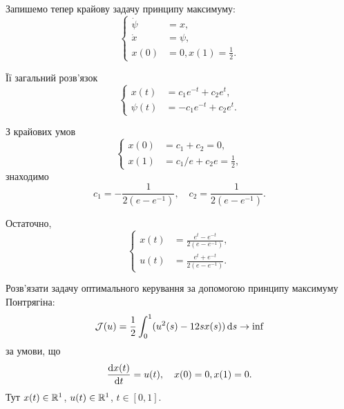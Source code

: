 \begin{solution}
	Запишемо тепер крайову задачу принципу максимуму: \[ \left\{ \begin{aligned}
		\dot \psi &= x, \\
		\dot x &= \psi, \\
		x(0) &= 0, x(1) = \frac{1}{2}.
	\end{aligned} \right. \]

	Її загальний розв'язок \[ \left\{ \begin{aligned}
		x(t) &= c_1 e^{-t} + c_2 e^t, \\
		\psi(t) &= - c_1 e^{-t} + c_2 e^t.
	\end{aligned} \right. \]

	З крайових умов \[ \left\{ \begin{aligned}
		x(0) &= c_1 + c_2 = 0, \\
		x(1) &= c_1 / e + c_2 e = \frac{1}{2},
	\end{aligned} \right. \] знаходимо \[c_1 = - \frac{1}{2(e-e^{-1})}, \quad c_2 = \frac{1}{2(e-e^{-1})}. \]

	Остаточно, \[ \left\{ \begin{aligned}
		x(t) &= \frac{e^t - e^{-t}}{2(e-e^{-1})}, \\
		u(t) &= \frac{e^t + e^{-t}}{2(e-e^{-1})}.
	\end{aligned} \right. \]
\end{solution}

\begin{problem}
	Розв'язати задачу оптимального керування за допомогою принципу максимуму Понтрягіна: \[ \mathcal{J} (u) = \frac{1}{2} \int_0^1 (u^2 (s) - 12 s x (s)) \mathop{}\!\mathrm{d} s \to \inf \] за умови, що \[ \frac{\mathop{}\!\mathrm{d} x(t)}{\mathop{}\!\mathrm{d} t} = u (t), \quad x(0) = 0, x(1) = 0. \] Тут $x (t) \in \mathbb{R}^1$, $u (t) \in \mathbb{R}^1$, $t \in [0, 1]$.
\end{problem}

